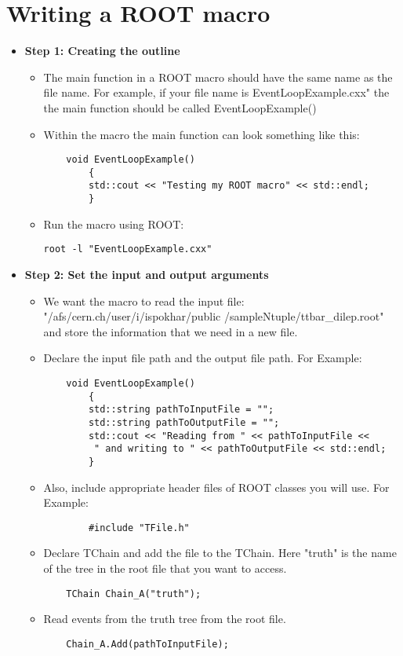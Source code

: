 \documentclass[letterpaper,12pt]{article}
\begin{document}
\section{Writing a ROOT macro}
\begin{itemize}
\item {\bf Step 1: Creating the outline}
\begin{itemize}
	\item The main function in a ROOT macro should have the same name as the file name. For example, if your file name is EventLoopExample.cxx" the the main function should be called EventLoopExample() 

	\item Within the macro the main function can look something like this:
	 \begin{lstlisting}
	void EventLoopExample()
	 	{
	 	std::cout << "Testing my ROOT macro" << std::endl;
	 	}

\end{lstlisting}
	\item Run the macro using ROOT:
\begin{verbatim}
root -l "EventLoopExample.cxx"
	\end{verbatim}
	\end{itemize} 	

	\item {\bf Step 2: Set the input and output arguments}\\
	\begin{itemize}
	
		\item We want the macro to read the input file: "/afs/cern.ch/user/i/ispokhar/public /sampleNtuple/ttbar\_dilep.root" and store the information that we need in a new file.
		\item Declare the input file path and the output file path. For Example:
			\begin{lstlisting}
	void EventLoopExample()
	 	{
	 	std::string pathToInputFile = "";
	 	std::string pathToOutputFile = "";
		std::cout << "Reading from " << pathToInputFile <<
		 " and writing to " << pathToOutputFile << std::endl;
	 	}
\end{lstlisting}

	\item Also, include appropriate header files of ROOT classes you will use. For Example:
		\begin{lstlisting}
		#include "TFile.h"
		\end{lstlisting}
	
\item Declare TChain and add the file to the TChain. Here "truth" is the name of the tree in the root file that you want to access. 
			\begin{lstlisting}
	TChain Chain_A("truth");
\end{lstlisting}
\item Read events from the truth tree from the root file.
\begin{lstlisting}
	Chain_A.Add(pathToInputFile);


\end{lstlisting}
\end{itemize}
\end{itemize}
\end{document}
